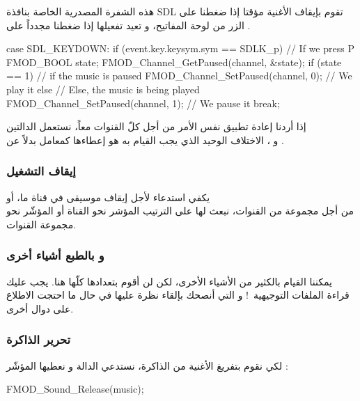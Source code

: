 هذه الشفرة المصدرية الخاصة بنافذة
\textenglish{SDL}
تقوم بإيقاف الأغنية مؤقتا إذا ضغطنا على الزر
من لوحة المفاتيح، و تعيد تفعيلها إذا ضغطنا مجدداً على
.

\begin{Csource}
case SDL_KEYDOWN:
if (event.key.keysym.sym == SDLK_p) // If we press P
{
	FMOD_BOOL state;
	FMOD_Channel_GetPaused(channel, &state);
	if (state == 1) // if the music is paused
		FMOD_Channel_SetPaused(channel, 0); // We play it
	else // Else, the music is being played
		FMOD_Channel_SetPaused(channel, 1); // We pause it
}
break;
\end{Csource}

 إذا أردنا إعادة تطبيق نفس الأمر من أجل كلّ القنوات معاً، نستعمل الدالتين\\
 و
،
الاختلاف الوحيد الذي يجب القيام به هو إعطاءها كمعامل
بدلاً عن 
.

\subsubsection{إيقاف التشغيل}

يكفي استدعاء
لأجل إيقاف موسيقى في قناة ما، أو\\
من أجل مجموعة من القنوات، نبعث لها على الترتيب المؤشر نحو القناة أو المؤشّر نحو مجموعة القنوات.

\subsubsection{و بالطبع أشياء أخرى}

يمكننا القيام بالكثير من الأشياء الأخرى، لكن لن أقوم بتعدادها كلّها هنا. يجب عليك قراءة الملفات التوجيهية~! و التي أنصحك بإلقاء نظرة عليها في حال ما احتجت الاطلاع على دوال أخرى.

\subsubsection{تحرير الذاكرة}

لكي نقوم بتفريغ الأغنية من الذاكرة، نستدعي الدالة
و نعطيها المؤشّر :

\begin{Csource}
FMOD_Sound_Release(music);
\end{Csource}

